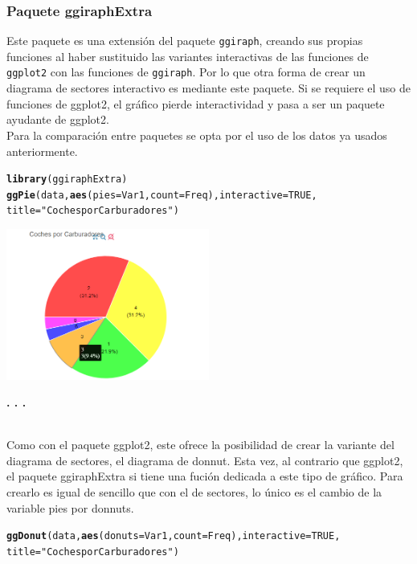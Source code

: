\documentclass{article}\usepackage[]{graphicx}\usepackage[]{color}
\makeatletter
\newcommand{\hlnum}[1]{\textcolor[rgb]{0.686,0.059,0.569}{#1}}%
\newcommand{\hlstr}[1]{\textcolor[rgb]{0.192,0.494,0.8}{#1}}%
\newcommand{\hlstd}[1]{\textcolor[rgb]{0.345,0.345,0.345}{#1}}%
\newcommand{\hlkwc}[1]{\textcolor[rgb]{0.333,0.667,0.333}{#1}}%
\newcommand{\hlkwd}[1]{\textcolor[rgb]{0.737,0.353,0.396}{\textbf{#1}}}%
\newenvironment{kframe}{%
 \def\at@end@of@kframe{}%
 \ifinner\ifhmode%
  \def\at@end@of@kframe{\end{minipage}}%
  \begin{minipage}{\columnwidth}%
 \fi\fi%
 \def\FrameCommand##1{\hskip\@totalleftmargin \hskip-\fboxsep
 \colorbox{shadecolor}{##1}\hskip-\fboxsep
     \hskip-\linewidth \hskip-\@totalleftmargin \hskip\columnwidth}%
 \MakeFramed {\advance\hsize-\width
   \@totalleftmargin\z@ \linewidth\hsize
   \@setminipage}}%
 {\par\unskip\endMakeFramed%
 \at@end@of@kframe}
\newenvironment{knitrout}{}{} %
\makeatother
\begin{document}
\subsubsection{Paquete ggiraphExtra}
Este paquete\cite{docu_ggiraphExtra} es una extensi\'on del paquete \texttt{ggiraph}, creando sus propias funciones al haber sustituido las variantes interactivas de las funciones de \texttt{ggplot2} con las funciones de \texttt{ggiraph}. Por lo que otra forma de crear un diagrama de sectores interactivo es mediante este paquete. Si se requiere el uso de funciones de ggplot2, el gr\'afico pierde interactividad y pasa a ser un paquete ayudante de ggplot2.~\\
Para la comparaci\'on entre paquetes se opta por el uso de los datos ya usados anteriormente. 
\begin{knitrout}
\color{fgcolor}\begin{kframe}
\begin{alltt}
\hlkwd{library}\hlstd{(ggiraphExtra)}
\hlkwd{ggPie}\hlstd{(data,} \hlkwd{aes}\hlstd{(} \hlkwc{pies}\hlstd{=Var1,} \hlkwc{count}\hlstd{=Freq),} \hlkwc{interactive} \hlstd{=} \hlnum{TRUE}\hlstd{,}
      \hlkwc{title} \hlstd{=} \hlstr{"Coches por Carburadores"}\hlstd{)}
\end{alltt}
\end{kframe}
\end{knitrout}
\vbox{
    \centering
    \includegraphics[width=0.5\textwidth]{imag/pir_ggiraph}
}
\begin{center}
\textbf{. . .}
\end{center}
~\\
Como con el paquete ggplot2, este ofrece la posibilidad de crear la variante del diagrama de sectores, el diagrama de donnut. Esta vez, al contrario que ggplot2, el paquete ggiraphExtra si tiene una fuci\'on dedicada a este tipo de gr\'afico. Para crearlo es igual de sencillo que con el de sectores, lo \'unico es el cambio de la variable pies por donnuts. 
\begin{knitrout}
\color{fgcolor}\begin{kframe}
\begin{alltt}
\hlkwd{ggDonut}\hlstd{(data,} \hlkwd{aes}\hlstd{(}\hlkwc{donuts}\hlstd{=Var1,} \hlkwc{count}\hlstd{=Freq),} \hlkwc{interactive} \hlstd{=} \hlnum{TRUE}\hlstd{,}
        \hlkwc{title} \hlstd{=} \hlstr{"Coches por Carburadores"}\hlstd{)}
\end{alltt}
\end{kframe}
\end{knitrout}
\end{document}
